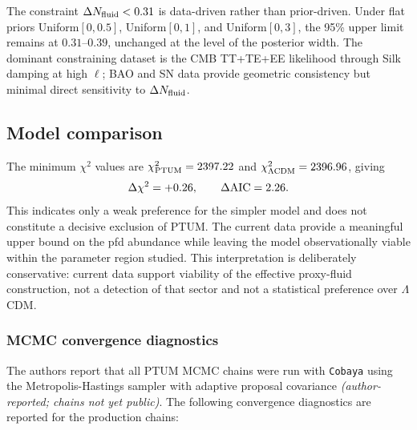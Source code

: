 \documentclass[epj]{svjour}
\begin{document}
The constraint \(\Delta N_{\rm fluid}<0.31\) is data-driven rather
than prior-driven. Under flat priors Uniform\([0,0.5]\),
Uniform\([0,1]\), and Uniform\([0,3]\), the 95\% upper limit
remains at \(0.31\)--\(0.39\), unchanged at the level of the
posterior width. The dominant constraining dataset is the CMB
TT+TE+EE likelihood through Silk damping at high \(\ell\); BAO and
SN data provide geometric consistency but minimal direct sensitivity
to \(\Delta N_{\rm fluid}\).

\subsection{Model comparison}

The minimum \(\chi^2\) values are
\(\chi^2_{\rm PTUM}=2397.22\) and
\(\chi^2_{\Lambda{\rm CDM}}=2396.96\), giving
\begin{equation}
\Delta\chi^2=+0.26,\qquad \Delta{\rm AIC}=2.26.
\end{equation}
This indicates only a weak preference for the simpler model and
does not constitute a decisive exclusion of PTUM. The current data
provide a meaningful upper bound on the pfd abundance while leaving
the model observationally viable within the parameter region studied.
This interpretation is deliberately conservative: current data support
viability of the effective proxy-fluid construction, not a detection of
that sector and not a statistical preference over \(\Lambda\)CDM.

\subsubsection{MCMC convergence diagnostics}
\label{sec:mcmc_diagnostics}

The authors report that all PTUM MCMC chains were run with
\texttt{Cobaya} using the Metropolis-Hastings sampler with adaptive
proposal covariance \emph{(author-reported; chains not yet public)}.
The following convergence diagnostics are reported for the production
chains:
\end{document}

